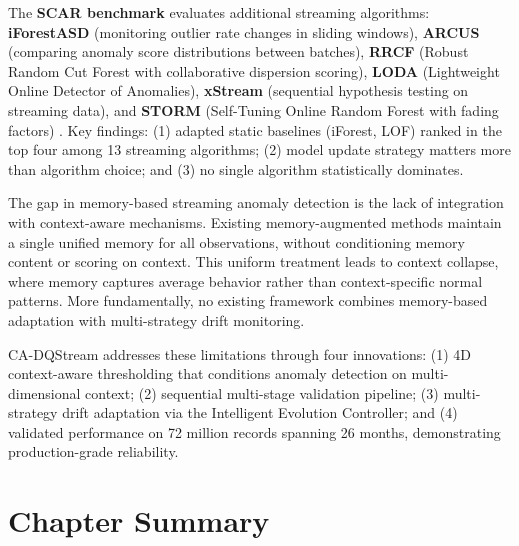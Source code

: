 The \textbf{SCAR benchmark} evaluates additional streaming algorithms: \textbf{iForestASD} (monitoring outlier rate changes in sliding windows), \textbf{ARCUS} (comparing anomaly score distributions between batches), \textbf{RRCF} (Robust Random Cut Forest with collaborative dispersion scoring), \textbf{LODA} (Lightweight Online Detector of Anomalies), \textbf{xStream} (sequential hypothesis testing on streaming data), and \textbf{STORM} (Self-Tuning Online Random Forest with fading factors) \citep{scar2025benchmark}. Key findings: (1) adapted static baselines (iForest, LOF) ranked in the top four among 13 streaming algorithms; (2) model update strategy matters more than algorithm choice; and (3) no single algorithm statistically dominates.

The gap in memory-based streaming anomaly detection is the lack of integration with context-aware mechanisms. Existing memory-augmented methods maintain a single unified memory for all observations, without conditioning memory content or scoring on context. This uniform treatment leads to context collapse, where memory captures average behavior rather than context-specific normal patterns. More fundamentally, no existing framework combines memory-based adaptation with multi-strategy drift monitoring.

CA-DQStream addresses these limitations through four innovations: (1) 4D context-aware thresholding that conditions anomaly detection on multi-dimensional context; (2) sequential multi-stage validation pipeline; (3) multi-strategy drift adaptation via the Intelligent Evolution Controller; and (4) validated performance on 72 million records spanning 26 months, demonstrating production-grade reliability.

\section{Chapter Summary}

